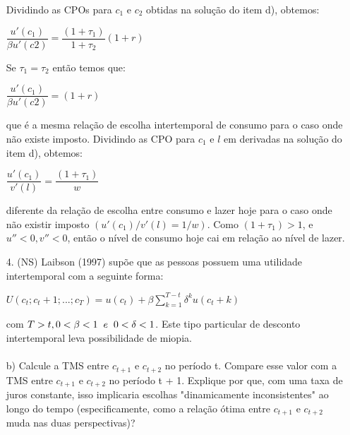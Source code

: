 \begin{enumerate}
Dividindo as CPOs para {$c_1$} e {$c_2$} obtidas na solução do item d), obtemos:\\

\begin{center}
{$\dfrac{u'(c_1)}{\beta u'(c2)} = \dfrac{(1 + \tau_1)}{1 + \tau_2} (1 + r)$}
\end{center}

Se {$ \tau_1 = \tau_2$} então temos que:

\begin{center}
{$\dfrac{u'(c_1)}{\beta u'(c2)} = (1 + r)$}
\end{center}

que é a mesma relação de escolha intertemporal de consumo para o caso onde não existe imposto. Dividindo as CPO para {$c_1$} e {$l$} em derivadas na solução do item d), obtemos:

\begin{center}
{$\dfrac{u'(c_1)}{v'(l)} = \dfrac{(1 + \tau_1)}{w}$} 
\end{center}

diferente da relação de escolha entre consumo e lazer hoje para o caso onde não existir imposto {$(u'(c_1)/v'(l) = 1/w)$}. Como {$(1 + \tau_1) > 1$}, e {$u'' < 0, v'' < 0$}, então o nível de
consumo hoje cai em relação ao nível de lazer.\\


\item[4.] (NS) Laibson (1997) supõe que as pessoas possuem uma utilidade intertemporal com a seguinte
forma:

\begin{center}
{$U(c_t; c_t+1; ... ; c_T ) = u(c_t)+ \beta \displaystyle \sum_{k = 1}^{T - t}  \delta ^ k u(c_t + k)$}
\end{center}

com {$T > t, 0 < \beta <1 \hspace{0,2cm} e \hspace{0,2cm} 0 < \delta <1$}. Este tipo particular de desconto intertemporal leva  possibilidade de miopia.\\


\paragraph{} b) Calcule a TMS entre {$c_{t+1}$} e {$c_{t+2}$} no período t. Compare esse valor com a TMS entre {$c_{t+1}$} e {$c_{t+2}$} no período t + 1. Explique por que, com uma taxa de juros constante, isso
implicaria escolhas "dinamicamente inconsistentes" ao longo do tempo (especificamente, como a relação ótima entre {$c_{t+1}$} e {$c_{t+2}$} muda nas duas perspectivas)?\\


\end{enumerate}
